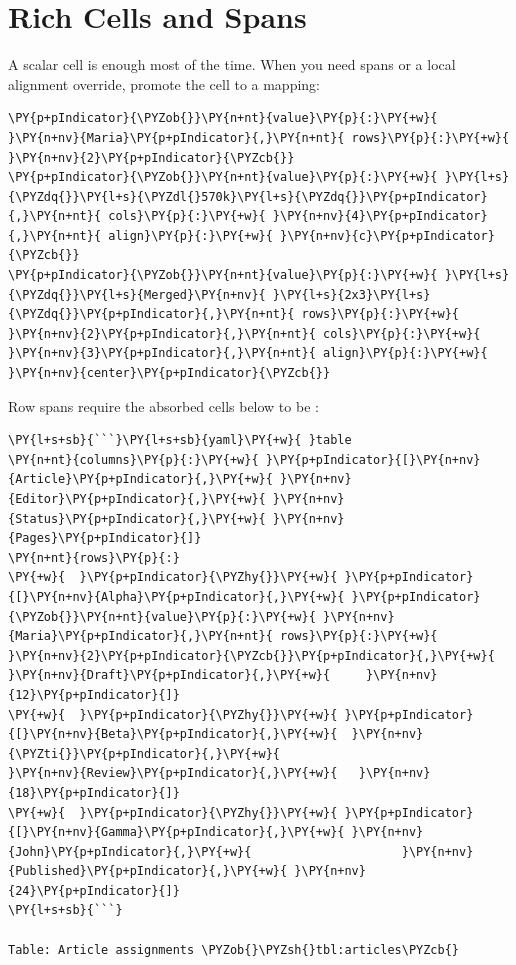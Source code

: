 \documentclass[a4paper,twoside]{article}
\begin{document}
\section{Rich Cells and Spans}
A scalar cell is enough most of the time. When you need spans or a local
alignment override, promote the cell to a mapping:
\begin{tscode}[lang=yaml, engine=pygments]
\begin{Verbatim}[commandchars=\\\{\},breaklines, breakanywhere, commandchars=\\\{\}]
\PY{p+pIndicator}{\PYZob{}}\PY{n+nt}{value}\PY{p}{:}\PY{+w}{ }\PY{n+nv}{Maria}\PY{p+pIndicator}{,}\PY{n+nt}{ rows}\PY{p}{:}\PY{+w}{ }\PY{n+nv}{2}\PY{p+pIndicator}{\PYZcb{}}
\PY{p+pIndicator}{\PYZob{}}\PY{n+nt}{value}\PY{p}{:}\PY{+w}{ }\PY{l+s}{\PYZdq{}}\PY{l+s}{\PYZdl{}570k}\PY{l+s}{\PYZdq{}}\PY{p+pIndicator}{,}\PY{n+nt}{ cols}\PY{p}{:}\PY{+w}{ }\PY{n+nv}{4}\PY{p+pIndicator}{,}\PY{n+nt}{ align}\PY{p}{:}\PY{+w}{ }\PY{n+nv}{c}\PY{p+pIndicator}{\PYZcb{}}
\PY{p+pIndicator}{\PYZob{}}\PY{n+nt}{value}\PY{p}{:}\PY{+w}{ }\PY{l+s}{\PYZdq{}}\PY{l+s}{Merged}\PY{n+nv}{ }\PY{l+s}{2x3}\PY{l+s}{\PYZdq{}}\PY{p+pIndicator}{,}\PY{n+nt}{ rows}\PY{p}{:}\PY{+w}{ }\PY{n+nv}{2}\PY{p+pIndicator}{,}\PY{n+nt}{ cols}\PY{p}{:}\PY{+w}{ }\PY{n+nv}{3}\PY{p+pIndicator}{,}\PY{n+nt}{ align}\PY{p}{:}\PY{+w}{ }\PY{n+nv}{center}\PY{p+pIndicator}{\PYZcb{}}
\end{Verbatim}
\end{tscode}
Row spans require the absorbed cells below to be \tscodeinline{\textasciitilde{}}:
\begin{tscode}[lang=markdown, engine=pygments]
\begin{Verbatim}[commandchars=\\\{\},breaklines, breakanywhere, commandchars=\\\{\}]
\PY{l+s+sb}{```}\PY{l+s+sb}{yaml}\PY{+w}{ }table
\PY{n+nt}{columns}\PY{p}{:}\PY{+w}{ }\PY{p+pIndicator}{[}\PY{n+nv}{Article}\PY{p+pIndicator}{,}\PY{+w}{ }\PY{n+nv}{Editor}\PY{p+pIndicator}{,}\PY{+w}{ }\PY{n+nv}{Status}\PY{p+pIndicator}{,}\PY{+w}{ }\PY{n+nv}{Pages}\PY{p+pIndicator}{]}
\PY{n+nt}{rows}\PY{p}{:}
\PY{+w}{  }\PY{p+pIndicator}{\PYZhy{}}\PY{+w}{ }\PY{p+pIndicator}{[}\PY{n+nv}{Alpha}\PY{p+pIndicator}{,}\PY{+w}{ }\PY{p+pIndicator}{\PYZob{}}\PY{n+nt}{value}\PY{p}{:}\PY{+w}{ }\PY{n+nv}{Maria}\PY{p+pIndicator}{,}\PY{n+nt}{ rows}\PY{p}{:}\PY{+w}{ }\PY{n+nv}{2}\PY{p+pIndicator}{\PYZcb{}}\PY{p+pIndicator}{,}\PY{+w}{ }\PY{n+nv}{Draft}\PY{p+pIndicator}{,}\PY{+w}{     }\PY{n+nv}{12}\PY{p+pIndicator}{]}
\PY{+w}{  }\PY{p+pIndicator}{\PYZhy{}}\PY{+w}{ }\PY{p+pIndicator}{[}\PY{n+nv}{Beta}\PY{p+pIndicator}{,}\PY{+w}{  }\PY{n+nv}{\PYZti{}}\PY{p+pIndicator}{,}\PY{+w}{                        }\PY{n+nv}{Review}\PY{p+pIndicator}{,}\PY{+w}{   }\PY{n+nv}{18}\PY{p+pIndicator}{]}
\PY{+w}{  }\PY{p+pIndicator}{\PYZhy{}}\PY{+w}{ }\PY{p+pIndicator}{[}\PY{n+nv}{Gamma}\PY{p+pIndicator}{,}\PY{+w}{ }\PY{n+nv}{John}\PY{p+pIndicator}{,}\PY{+w}{                     }\PY{n+nv}{Published}\PY{p+pIndicator}{,}\PY{+w}{ }\PY{n+nv}{24}\PY{p+pIndicator}{]}
\PY{l+s+sb}{```}

Table: Article assignments \PYZob{}\PYZsh{}tbl:articles\PYZcb{}
\end{Verbatim}
\end{tscode}
\end{document}
